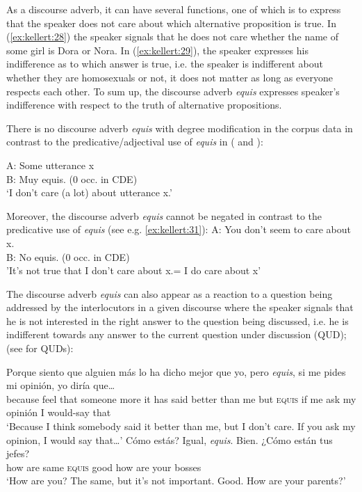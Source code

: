 \documentclass[output=paper]{langsci/langscibook}
\begin{document}
As a discourse adverb, it can have several functions, one of which is to express that the speaker does not care about which alternative proposition is true. In (\ref{ex:kellert:28}) the speaker signals that he does not care whether the name of some girl is Dora or Nora. In (\ref{ex:kellert:29}), the speaker expresses his indifference as to which answer is true, i.e. the speaker is indifferent about whether they are homosexuals or not, it does not matter as long as everyone respects each other. To sum up, the discourse adverb \textit{equis} expresses speaker’s indifference with respect to the truth of alternative propositions.

There is no discourse adverb \textit{equis} with degree modification in the corpus data in contrast to the predicative/adjectival use of \textit{equis} in ( and ):

\ea\label{ex:kellert:30}
\gll A: Some utterance x \\
B: Muy equis. (0 occ. in CDE)\\
\glt ‘I don’t care (a lot) about utterance x.’
\z

Moreover, the discourse adverb \textit{equis} cannot be negated in contrast to the predicative use of \textit{equis} (see e.g. \ref{ex:kellert:31}):
\ea\label{ex:kellert:31}
\gll A: You don't seem to care about x. \\
B: No equis. (0 occ. in CDE)\\
\glt 'It's not true that I don't care about x.= I do care about x'
\z

The discourse adverb \textit{equis} can also appear as a reaction to a question being addressed by the interlocutors in a given discourse where the speaker signals that he is not interested in the right answer to the question being discussed, i.e. he is indifferent towards any answer to the current question under discussion (QUD); (see \citealt{Roberts1996} for QUDs):

\ea\label{ex:kellert:32}
\gll Porque siento que alguien más lo ha dicho mejor que yo, pero \textit{equis}, si me pides mi opinión, yo diría que…\\
because feel that someone more it has said better than me but \textsc{equis}	if me ask my opinión I would-say that\\
\glt ‘Because I think somebody said it better than me, but I don’t care. If you ask my opinion, I would say that…’
\ex 
{}Cómo	estás? Igual, \textit{equis}. Bien. {¿}Cómo están tus jefes?\\
how are same \textsc{equis} good how are your bosses\\
\glt ‘How are you? The same, but it’s not important. Good. How are your parents?’
\z
\end{document}
